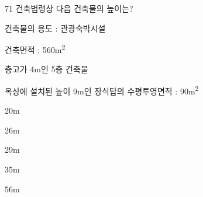 \begin{question}{71}
건축법령상 다음 건축물의 높이는?
\begin{framedtext}
건축물의 용도 : 관광숙박시설 \par
건축면적 : 560m\textsuperscript{2} \par
층고가 4m인 5층 건축물 \par
옥상에 설치된 높이 9m인 장식탑의 수평투영면적 : 90m\textsuperscript{2}
\end{framedtext}
\begin{choices}
  \item 20m
  \item 26m
  \item 29m
  \item 35m
  \item 56m
\end{choices}
\end{question}
